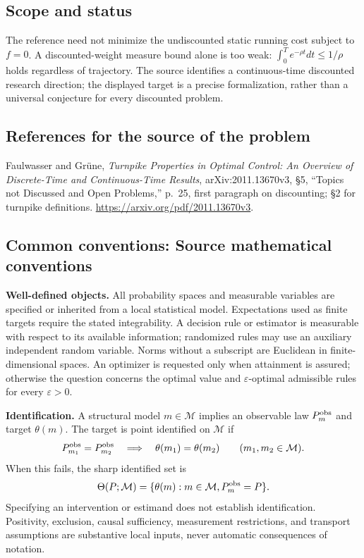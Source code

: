 \documentclass[11pt,a4paper]{article}
\begin{document}
\subsection*{Scope and status}
The reference need not minimize the undiscounted static running cost
subject to $f=0$. A discounted-weight measure bound alone is too weak:
$\int_0^T e^{-\rho t}dt\leq1/\rho$ holds regardless of trajectory.
The source identifies a continuous-time discounted research direction;
the displayed target is a precise formalization, rather than a universal
conjecture for every discounted problem.
\subsection*{References for the source of the problem}
Faulwasser and Gr\"une, \emph{Turnpike Properties in Optimal Control:
An Overview of Discrete-Time and Continuous-Time Results},
arXiv:2011.13670v3, \S5, ``Topics not Discussed and Open Problems,''
p.~25, first paragraph on discounting; \S2 for turnpike definitions.
\url{https://arxiv.org/pdf/2011.13670v3}.

\subsection*{Common conventions: Source mathematical conventions}

\textbf{Well-defined objects.}
All probability spaces and measurable variables are specified or inherited
from a local statistical model. Expectations used as finite targets require
the stated integrability. A decision rule or estimator is measurable with
respect to its available information; randomized rules may use an auxiliary
independent random variable. Norms without a subscript are Euclidean in
finite-dimensional spaces. An optimizer is requested only when attainment
is assured; otherwise the question concerns the optimal value and
$\varepsilon$-optimal admissible rules for every $\varepsilon>0$.

\textbf{Identification.}
A structural model $m\in\mathcal M$ implies an observable law
$P_m^{\rm obs}$ and target $\theta(m)$. The target is point identified on
$\mathcal M$ if
\[
 P_{m_1}^{\rm obs}=P_{m_2}^{\rm obs}
 \quad\Longrightarrow\quad\theta(m_1)=\theta(m_2)
 \qquad(m_1,m_2\in\mathcal M).
\]
When this fails, the sharp identified set is
\[
 \Theta(P;\mathcal M)=\{\theta(m):m\in\mathcal M,
                                  P_m^{\rm obs}=P\}.
\]
Specifying an intervention or estimand does not establish identification.
Positivity, exclusion, causal sufficiency, measurement restrictions, and
transport assumptions are substantive local inputs, never automatic
consequences of notation.
\end{document}
